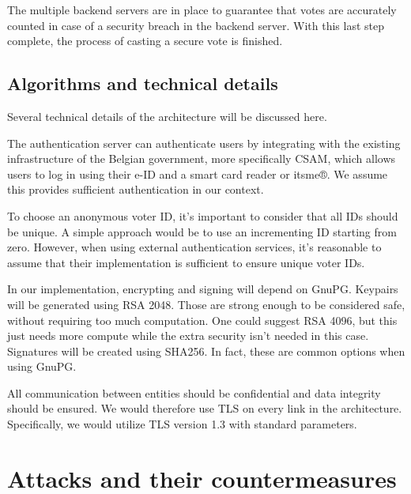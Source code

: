 \documentclass[a4paper,12pt,english]{article}
\begin{document}
The multiple backend servers are in place to guarantee that votes are accurately counted in case of a security breach in the backend server. With this last step complete, the process of casting a secure vote is finished.

\subsection{Algorithms and technical details}\label{sec:design-algos}

Several technical details of the architecture will be discussed here.


The authentication server can authenticate users by integrating with the existing infrastructure of the Belgian government, more specifically CSAM, which allows users to log in using their e-ID and a smart card reader or itsme®. We assume this provides sufficient authentication in our context.


To choose an anonymous voter ID, it's important to consider that all IDs should be unique. A simple approach would be to use an incrementing ID starting from zero. However, when using external authentication services, it’s reasonable to assume that their implementation is sufficient to ensure unique voter IDs.


In our implementation, encrypting and signing will depend on GnuPG. Keypairs will be generated using RSA 2048. Those are strong enough to be considered safe, without requiring too much computation. One could suggest RSA 4096, but this just needs more compute while the extra security isn’t needed in this case. Signatures will be created using SHA256. In fact, these are common options when using GnuPG.


All communication between entities should be confidential and data integrity should be ensured. We would therefore use TLS on every link in the architecture. Specifically, we would utilize TLS version 1.3 with standard parameters.

\section{Attacks and their countermeasures}\label{sec:attacks}
\end{document}
